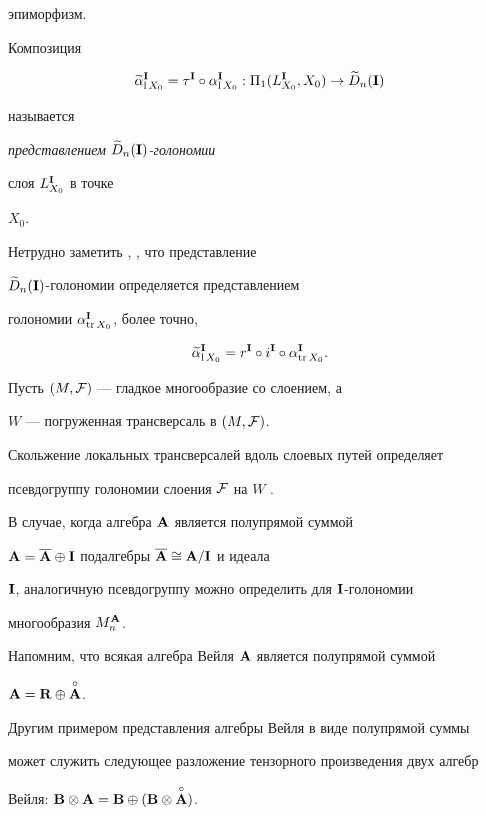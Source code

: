 эпиморфизм.


Композиция


$$


\widetilde\alpha^\I_{{\mathrm l}\,X_0}=


\tau^\I\circ\alpha^\I_{{\mathrm l}\,X_0}:


\Pi_1(L^\I_{X_0},X_0)\to\widetilde D_n(\I)


$$


называется {\it представлением $\widetilde D_n({\bold I})$-голономии


слоя $L^{\bold I}_{X_0}$ в точке} $X_0$.


Нетрудно заметить \cite{VSh3}, \cite{VSh4}, что представление


$\widetilde D_n({\bold I})$-голономии определяется представлением


голономии $\alpha^{\bold I}_{\operatorname{tr} X_0}$, более точно,


\begin{equation}


\widetilde\alpha^\I_{{\mathrm l}\,X_0}=r^\I\circ i^\I\circ


\alpha^\I_{\tr X_0}.


\label{l.06}


\end{equation}


 


Пусть $(M,\cal F)$ --- гладкое многообразие со слоением, а


$W$ --- погруженная трансверсаль в $(M,\cal F)$.


Скольжение локальных трансверсалей вдоль слоевых путей определяет


псевдогруппу голономии слоения $\cal F$ на $W$ \cite{Mol}.


В случае, когда алгебра ${\bold A}$ является полупрямой суммой


${\bold A}=\overline{{\bold A}}\oplus{\bold I}$ подалгебры $\overline{{\bold A}}\cong{\bold A}/{\bold I}$ и идеала


${\bold I}$, аналогичную псевдогруппу можно определить для ${\bold I}$-голономии


многообразия $M^{\bold A}_n$.


Напомним, что всякая алгебра Вейля ${\bold A}$ является полупрямой суммой


${\bold A}={\bold R}\oplus{\overset{\circ}{\bold A}{}}$.


Другим примером представления алгебры Вейля в виде полупрямой суммы


может служить следующее разложение тензорного произведения двух алгебр


Вейля: ${\bold B}\otimes{\bold A}={\bold B}\oplus({\bold B}\otimes\overset{\circ}{\bold A}{})$.


